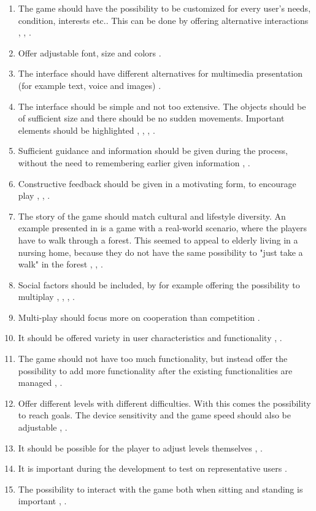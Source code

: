 \begin{enumerate}[{g}.1]
\renewcommand{\labelitemi}{$\bullet$}
\item The game should have the possibility to be customized for every user's needs, condition, interests etc.. This can be done by offering alternative interactions \cite{Billis}, \cite{gregor}, \cite{gerling1}.
\item Offer adjustable font, size and colors \cite{Billis}.
\item The interface should have different alternatives for multimedia presentation (for example text, voice and images) \cite{Billis}.
\item The interface should be simple and not too extensive. The objects should be of sufficient size and there should be no sudden movements. Important elements should be highlighted \cite{Billis}, \cite{gerling1}, \cite{gerling2}, \cite{exergamesforelderly}.
\item Sufficient guidance and information should be given during the process, without the need to remembering earlier given information \cite{Billis}, \cite{gregor}.
\item Constructive feedback should be given in a motivating form, to encourage play \cite{Billis}, \cite{gerling1}, \cite{exergamesforelderly}.
\item The story of the game should match cultural and lifestyle diversity. An example presented in \cite{gerling2} is a game with a real-world scenario, where the players have to walk through a forest. This seemed to appeal to elderly living in a nursing home, because they do not have the same possibility to "just take a walk" in the forest \cite{Billis}, \cite{gregor}, \cite{gerling2}. 
\item Social factors should be included, by for example offering the possibility to multiplay \cite{Billis}, \cite{gerling2}, \cite{gerling1}, \cite{exergamesforelderly}.
\item Multi-play should focus more on cooperation than competition \cite{Gajadhar}.
\item It should be offered variety in user characteristics and functionality \cite{gregor}, \cite{gerling1}.
\item The game should not have too much functionality, but instead offer the possibility to add more functionality after the existing functionalities are managed \cite{gregor}, \cite{gerling2}.
\item Offer different levels with different difficulties. With this comes the possibility to reach goals. The device sensitivity and the game speed should also be adjustable \cite{gregor}, \cite{gerling1}.
\item It should be possible for the player to adjust levels themselves \cite{gregor}, \cite{gerling1}. 
\item It is important during the development to test on representative users \cite{gregor}.
\item The possibility to interact with the game both when sitting and standing is important \cite{gerling1}, \cite{gerling2}.
\end{enumerate}

